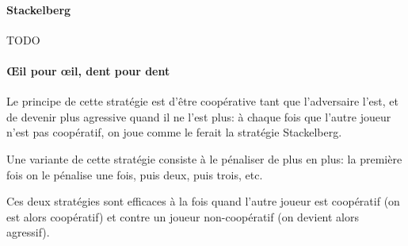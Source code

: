     \paragraph{Stackelberg}
      TODO

    \paragraph{Œil pour œil, dent pour dent}
      Le principe de cette stratégie est d'être coopérative tant que
      l'adversaire l'est, et de devenir plus agressive quand il ne l'est plus:
      à chaque fois que l'autre joueur n'est pas coopératif, on joue comme le
      ferait la stratégie Stackelberg.

      Une variante de cette stratégie consiste à le pénaliser de plus en plus:
      la première fois on le pénalise une fois, puis deux, puis trois, etc.

      Ces deux stratégies sont efficaces à la fois quand l'autre joueur est
      coopératif (on est alors coopératif) et contre un joueur non-coopératif
      (on devient alors agressif).

